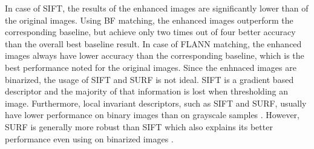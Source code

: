 \documentclass[draft,final]{vutinfth} %
\begin{document}
In case of SIFT, the results of the enhanced images are significantly lower than of the original images.
Using BF matching, the enhanced images outperform the corresponding baseline, but achieve only two times out of four better accuracy than the overall best baseline result.
In case of FLANN matching, the enhanced images always have lower accuracy than the corresponding baseline, which is the best performance noted for the original images. 
Since the enhnaced images are binarized, the usage of SIFT and SURF is not ideal.
SIFT is a gradient based descriptor and the majority of that information is lost when thresholding an image.
Furthermore, local invariant descriptors, such as SIFT and SURF, usually have lower performance on binary images than on grayscale samples \cite{wang2017manifold}.
However, SURF is generally more robust than SIFT which also explains its better performance even using on binarized images \cite{bay2006surf}.

\end{document}
